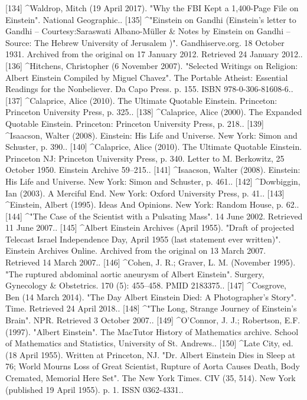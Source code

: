 [134]
^Waldrop, Mitch (19 April 2017). "Why the FBI Kept a 1,400-Page File on Einstein". National Geographic..
[135]
^"Einstein on Gandhi (Einstein's letter to Gandhi – Courtesy:Saraswati Albano-Müller & Notes by Einstein on Gandhi – Source: The Hebrew University of Jerusalem )". Gandhiserve.org. 18 October 1931. Archived from the original on 17 January 2012. Retrieved 24 January 2012..
[136]
^Hitchens, Christopher (6 November 2007). "Selected Writings on Religion: Albert Einstein Compiled by Miguel Chavez". The Portable Atheist: Essential Readings for the Nonbeliever. Da Capo Press. p. 155. ISBN 978-0-306-81608-6..
[137]
^Calaprice, Alice (2010). The Ultimate Quotable Einstein. Princeton: Princeton University Press, p. 325..
[138]
^Calaprice, Alice (2000). The Expanded Quotable Einstein. Princeton: Princeton University Press, p. 218..
[139]
^Isaacson, Walter (2008). Einstein: His Life and Universe. New York: Simon and Schuster, p. 390..
[140]
^Calaprice, Alice (2010). The Ultimate Quotable Einstein. Princeton NJ: Princeton University Press, p. 340. Letter to M. Berkowitz, 25 October 1950. Einstein Archive 59–215..
[141]
^Isaacson, Walter (2008). Einstein: His Life and Universe. New York: Simon and Schuster, p. 461..
[142]
^Dowbiggin, Ian (2003). A Merciful End. New York: Oxford University Press, p. 41..
[143]
^Einstein, Albert (1995). Ideas And Opinions. New York: Random House, p. 62..
[144]
^"The Case of the Scientist with a Pulsating Mass". 14 June 2002. Retrieved 11 June 2007..
[145]
^Albert Einstein Archives (April 1955). "Draft of projected Telecast Israel Independence Day, April 1955 (last statement ever written)". Einstein Archives Online. Archived from the original on 13 March 2007. Retrieved 14 March 2007..
[146]
^Cohen, J. R.; Graver, L. M. (November 1995). "The ruptured abdominal aortic aneurysm of Albert Einstein". Surgery, Gynecology & Obstetrics. 170 (5): 455–458. PMID 2183375..
[147]
^Cosgrove, Ben (14 March 2014). "The Day Albert Einstein Died: A Photographer's Story". Time. Retrieved 24 April 2018..
[148]
^"The Long, Strange Journey of Einstein's Brain". NPR. Retrieved 3 October 2007..
[149]
^O'Connor, J. J.; Robertson, E.F. (1997). "Albert Einstein". The MacTutor History of Mathematics archive. School of Mathematics and Statistics, University of St. Andrews..
[150]
^Late City, ed. (18 April 1955). Written at Princeton, NJ. "Dr. Albert Einstein Dies in Sleep at 76; World Mourns Loss of Great Scientist, Rupture of Aorta Causes Death, Body Cremated, Memorial Here Set". The New York Times. CIV (35, 514). New York (published 19 April 1955). p. 1. ISSN 0362-4331..
